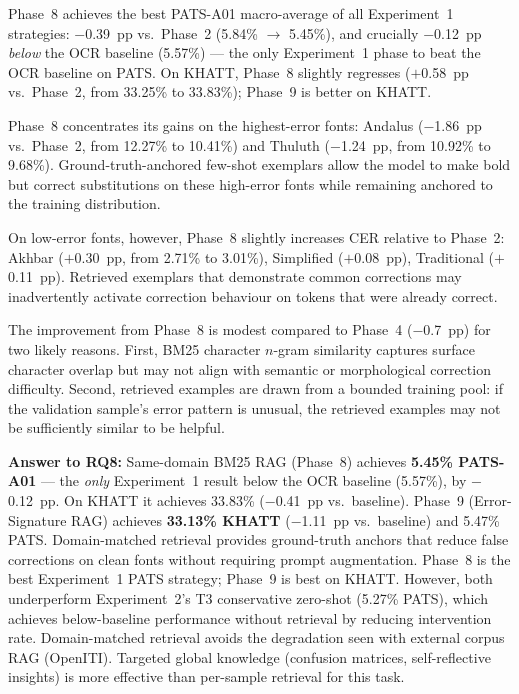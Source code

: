 Phase~8 achieves the best PATS-A01 macro-average of all Experiment~1
strategies: $-$0.39~pp vs.\ Phase~2 (5.84\% $\to$ 5.45\%), and crucially
$-$0.12~pp \emph{below} the OCR baseline (5.57\%) --- the only Experiment~1
phase to beat the OCR baseline on PATS. On KHATT, Phase~8 slightly regresses
($+$0.58~pp vs.\ Phase~2, from 33.25\% to 33.83\%); Phase~9 is better on KHATT.

Phase~8 concentrates its gains on the highest-error fonts: Andalus
($-$1.86~pp vs.\ Phase~2, from 12.27\% to 10.41\%) and Thuluth
($-$1.24~pp, from 10.92\% to 9.68\%). Ground-truth-anchored few-shot
exemplars allow the model to make bold but correct substitutions on
these high-error fonts while remaining anchored to the training distribution.

On low-error fonts, however, Phase~8 slightly increases CER relative to
Phase~2: Akhbar ($+$0.30~pp, from 2.71\% to 3.01\%), Simplified ($+$0.08~pp),
Traditional ($+$0.11~pp). Retrieved exemplars that demonstrate common
corrections may inadvertently activate correction behaviour on tokens that
were already correct.

The improvement from Phase~8 is modest compared to Phase~4 ($-$0.7~pp) for
two likely reasons. First, BM25 character $n$-gram similarity captures
surface character overlap but may not align with semantic or morphological
correction difficulty. Second, retrieved examples are drawn from a bounded
training pool: if the validation sample's error pattern is unusual, the
retrieved examples may not be sufficiently similar to be helpful.

\textbf{Answer to RQ8:} Same-domain BM25 RAG (Phase~8) achieves \textbf{5.45\%
PATS-A01} --- the \emph{only} Experiment~1 result below the OCR baseline
(5.57\%), by $-$0.12~pp. On KHATT it achieves 33.83\% ($-$0.41~pp vs.\
baseline). Phase~9 (Error-Signature RAG) achieves \textbf{33.13\% KHATT}
($-$1.11~pp vs.\ baseline) and 5.47\% PATS. Domain-matched retrieval
provides ground-truth anchors that reduce false corrections on clean fonts
without requiring prompt augmentation. Phase~8 is the best Experiment~1
PATS strategy; Phase~9 is best on KHATT. However, both underperform
Experiment~2's T3 conservative zero-shot (5.27\% PATS), which achieves
below-baseline performance without retrieval by reducing intervention rate.
Domain-matched retrieval avoids the degradation seen with external corpus
RAG (OpenITI). Targeted global knowledge (confusion matrices, self-reflective insights)
is more effective than per-sample retrieval for this task.

